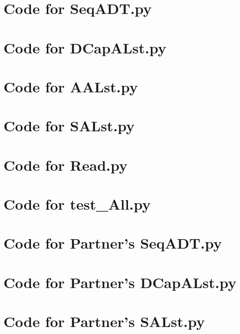 \documentclass[12pt]{article}
\begin{document}
\noindent 

\newpage

\section{Code for SeqADT.py}

\noindent 

\newpage

\section{Code for DCapALst.py}

\noindent 

\newpage

\section{Code for AALst.py}

\noindent 

\newpage

\section{Code for SALst.py}

\noindent 

\newpage

\section{Code for Read.py}

\noindent 

\newpage

\section{Code for test\_All.py}

\noindent 

\newpage

\section{Code for Partner's SeqADT.py}

\noindent 

\newpage

\section{Code for Partner's DCapALst.py}

\noindent 

\newpage

\section{Code for Partner's SALst.py}

\noindent 
\end{document}
